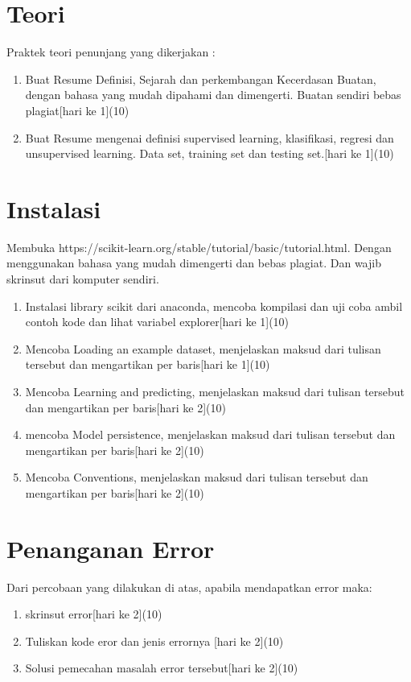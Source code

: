 \section{Teori}
Praktek teori penunjang yang dikerjakan :
\begin{enumerate}
\item
Buat Resume Definisi, Sejarah dan perkembangan Kecerdasan Buatan, dengan bahasa yang mudah dipahami dan dimengerti. Buatan sendiri bebas plagiat[hari ke 1](10)
\item
Buat Resume mengenai definisi supervised learning, klasifikasi, regresi dan unsupervised learning. Data set, training set dan testing set.[hari ke 1](10)
\end{enumerate}

\section{Instalasi}
Membuka https://scikit-learn.org/stable/tutorial/basic/tutorial.html. Dengan menggunakan bahasa yang mudah dimengerti dan bebas plagiat.
Dan wajib skrinsut dari komputer sendiri.
\begin{enumerate}
\item
Instalasi library scikit dari anaconda, mencoba kompilasi dan uji coba ambil contoh kode dan lihat variabel explorer[hari ke 1](10)
\item
Mencoba Loading an example dataset, menjelaskan maksud dari tulisan tersebut dan mengartikan per baris[hari ke 1](10)
\item
Mencoba Learning and predicting, menjelaskan maksud dari tulisan tersebut dan mengartikan per baris[hari ke 2](10)
\item
mencoba Model persistence, menjelaskan maksud dari tulisan tersebut dan mengartikan per baris[hari ke 2](10)
\item
Mencoba Conventions, menjelaskan maksud dari tulisan tersebut dan mengartikan per baris[hari ke 2](10)
\end{enumerate}


\section{Penanganan Error}
Dari percobaan yang dilakukan di atas, apabila mendapatkan error maka:

\begin{enumerate}
	\item
	skrinsut error[hari ke 2](10)
	\item
Tuliskan kode eror dan jenis errornya [hari ke 2](10)
	\item
Solusi pemecahan masalah error tersebut[hari ke 2](10)

\end{enumerate}

